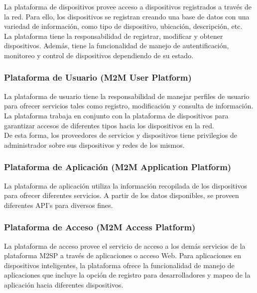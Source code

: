 \documentclass[journal]{IEEEtran}
\begin{document}
La plataforma de dispositivos provee acceso a dispositivos registrados a través de la red. Para ello, los dispositivos se registran creando una base de datos con una variedad de información, como tipo de dispositivo, ubicación, descripción, etc.\\
La plataforma tiene la responsabilidad de registrar, modificar y obtener dispositivos. Además, tiene la funcionalidad de manejo de autentificación, monitoreo y control de dispositivos dependiendo de su estado.\\

\subsubsection{Plataforma de Usuario (M2M User Platform)}

La plataforma de usuario tiene la responsabilidad de manejar perfiles de usuario para ofrecer servicios tales como registro, modificación y consulta de información. La plataforma trabaja en conjunto con la plataforma de dispositivos para garantizar accesos de diferentes tipos hacia los dispositivos en la red.\\
De esta forma, los proveedores de servicios y dispositivos tiene privilegios de administrador sobre sus dispositivos y redes de los mismos.\\

\subsubsection{Plataforma de Aplicación (M2M Application Platform)}

La plataforma de aplicación utiliza la información recopilada de los dispositivos para ofrecer diferentes servicios. A partir de los datos disponibles, se proveen diferentes API's para diversos fines.\\

\subsubsection{Plataforma de Acceso (M2M Access Platform)}

La plataforma de acceso provee el servicio de acceso a los demás servicios de la plataforma M2SP a través de aplicaciones o acceso Web. Para aplicaciones en dispositivos inteligentes, la plataforma ofrece la funcionalidad de manejo de aplicaciones que incluye la opción de registro para desarrolladores y mapeo de la aplicación hacia diferentes dispositivos.\\
\end{document}

